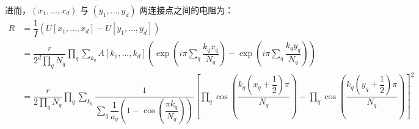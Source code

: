 进而，\((x_1, \ldots, x_d)\) 与 \((y_1, \ldots, y_d)\) 两连接点之间的电阻为：
\small
\begin{align*}
	R & = \dfrac{1}{I} \left( U[x_1, \ldots, x_d] - U[y_1, \ldots, y_d] \right)                                                                                                                                                                                                                                \\
	  & = \dfrac{r}{2^d \prod_q N_q} \prod_q \sum_{k_q} A[k_1, \ldots, k_d] \left( \exp\left( i\pi \sum_q \dfrac{k_q x_q}{N_q} \right) - \exp\left( i\pi \sum_q \dfrac{k_q y_q}{N_q} \right) \right)                                                                                                           \\
	  & = \dfrac{r}{2 \prod_q N_q} \prod_q \sum_{k_q} \dfrac{1}{\sum_q \dfrac{1}{a_q} \left( 1 - \cos\left( \dfrac{\pi k_q}{N_q} \right) \right)} \left[ \prod_q \cos\left( \dfrac{k_q (x_q + \dfrac{1}{2}) \pi}{N_q} \right) - \prod_q \cos\left( \dfrac{k_q (y_q + \dfrac{1}{2}) \pi}{N_q} \right) \right]^2
\end{align*}


